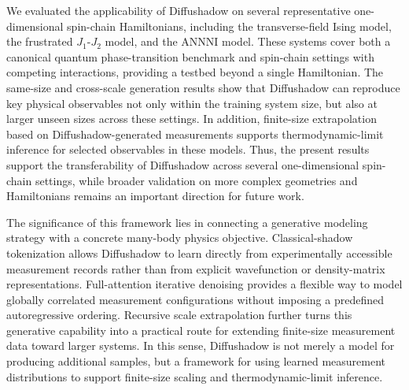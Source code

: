 \documentclass[pdflatex,sn-mathphys-num]{sn-jnl}%
\theoremstyle{thmstyleone}%
\theoremstyle{thmstyletwo}%
\theoremstyle{thmstylethree}%
\begin{document}
We evaluated the applicability of Diffushadow on several representative one-dimensional spin-chain Hamiltonians, including the transverse-field Ising model, the frustrated $J_1$-$J_2$ model, and the ANNNI model. These systems cover both a canonical quantum phase-transition benchmark and spin-chain settings with competing interactions, providing a testbed beyond a single Hamiltonian. The same-size and cross-scale generation results show that Diffushadow can reproduce key physical observables not only within the training system size, but also at larger unseen sizes across these settings. In addition, finite-size extrapolation based on Diffushadow-generated measurements supports thermodynamic-limit inference for selected observables in these models.
Thus, the present results support the transferability of Diffushadow across several one-dimensional spin-chain settings, while broader validation on more complex geometries and Hamiltonians remains an important direction for future work.


The significance of this framework lies in connecting a generative modeling strategy with a concrete many-body physics objective. Classical-shadow tokenization allows Diffushadow to learn directly from experimentally accessible measurement records rather than from explicit wavefunction or density-matrix representations. Full-attention iterative denoising provides a flexible way to model globally correlated measurement configurations without imposing a predefined autoregressive ordering. Recursive scale extrapolation further turns this generative capability into a practical route for extending finite-size measurement data toward larger systems. In this sense, Diffushadow is not merely a model for producing additional samples, but a framework for using learned measurement distributions to support finite-size scaling and thermodynamic-limit inference.
\end{document}
